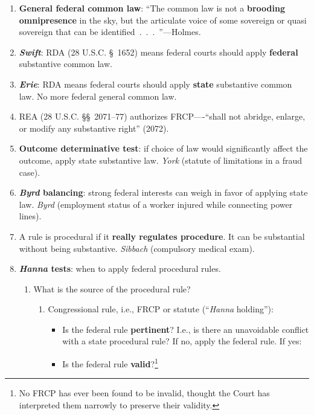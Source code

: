 \begin{enumerate}
    \item \textbf{General federal common law}: ``The common law is not a 
    \textbf{brooding omnipresence} in the sky, but the articulate voice of 
    some sovereign or quasi sovereign that can be 
    identified~.~.~.~''---Holmes.
    \item \textbf{\emph{Swift}}: RDA (28 U.S.C. \S\ 1652) means federal courts 
    should apply \textbf{federal} substantive common law.
    \item \textbf{\emph{Erie}}: RDA means federal courts should apply 
    \textbf{state} substantive common law. No more federal general common law.
    \item REA (28 U.S.C. \S\S\ 2071--77) authorizes FRCP----``shall not 
    abridge, enlarge, or modify any substantive right'' (2072).
    \item \textbf{Outcome determinative test}: if choice of law would 
    significantly affect the outcome, apply state substantive law.  
    \emph{York} (statute of limitations in a fraud case).
    \item \textbf{\emph{Byrd} balancing}: strong federal interests can weigh 
    in favor of applying state law. \emph{Byrd} (employment status of a worker 
    injured while connecting power lines).
    \item A rule is procedural if it \textbf{really regulates procedure}.  It 
    can be substantial without being substantive. \emph{Sibbach} (compulsory 
    medical exam).
    \item \textbf{\emph{Hanna} tests}: when to apply federal procedural rules.
    \begin{enumerate}
        \item What is the source of the procedural rule?
        \begin{enumerate}
            \item Congressional rule, i.e., FRCP or statute (``\emph{Hanna} 
            holding''):
            \begin{itemize}
                \item Is the federal rule \textbf{pertinent}? I.e., is there 
                an unavoidable conflict with a state procedural rule? If no, 
                apply the federal rule. If yes:
                \item Is the federal rule \textbf{valid}?\footnote{No FRCP has 
                ever been found to be invalid, thought the Court has 
                interpreted them narrowly to preserve their validity.}

\end{itemize}
\end{enumerate}
\end{enumerate}
\end{enumerate}
